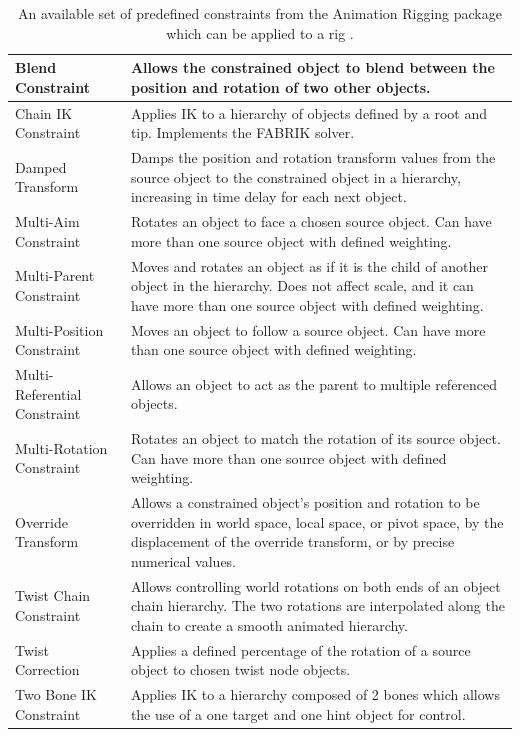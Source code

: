 \begin{table}
    \centering
    \caption{An available set of predefined constraints from the Animation
    Rigging package which can be applied to a rig
\cite{unity_animation_rigging}.}
    \begin{tabular} { |m{5cm}|m{10cm}| }
        \hline
        Blend Constraint & \footnotesize Allows the constrained object to blend
        between the position and rotation of two other objects. \\
        \hline
        Chain IK Constraint & \footnotesize Applies IK to a hierarchy of objects
        defined by a root and tip. Implements the FABRIK solver. \\
        \hline
        Damped Transform & \footnotesize Damps the position and rotation
        transform values from the source object to the constrained object in
        a hierarchy, increasing in time delay for each next object. \\
        \hline
        Multi-Aim Constraint & \footnotesize Rotates an object to face a chosen
        source object. Can have more than one source object with defined
        weighting. \\
        \hline
        Multi-Parent Constraint & \footnotesize Moves and rotates an object as
        if it is the child of another object in the hierarchy. Does not affect
        scale, and it can have more than one source object with defined
        weighting. \\
        \hline
        Multi-Position Constraint & \footnotesize Moves an object to follow
        a source object. Can have more than one source object with defined
        weighting. \\
        \hline
        Multi-Referential Constraint & \footnotesize Allows an object to act as
        the parent to multiple referenced objects.\\
        \hline
        Multi-Rotation Constraint & \footnotesize Rotates an object to match the
        rotation of its source object. Can have more than one source object with
        defined weighting. \\
        \hline
        Override Transform & \footnotesize Allows a constrained object's
        position and rotation to be overridden in world space, local space, or
        pivot space, by the displacement of the override transform, or by
        precise numerical values. \\
        \hline
        Twist Chain Constraint & \footnotesize Allows controlling world
        rotations on both ends of an object chain hierarchy. The two rotations
        are interpolated along the chain to create a smooth animated hierarchy.
        \\
        \hline
        Twist Correction & \footnotesize Applies a defined percentage of the
        rotation of a source object to chosen twist node objects. \\
        \hline
        Two Bone IK Constraint & \footnotesize Applies IK to a hierarchy
        composed of 2 bones which allows the use of a one target and one hint
        object for control. \\
        \hline

    \end{tabular}
    \label{tbl:ar_constraints}
\end{table}
